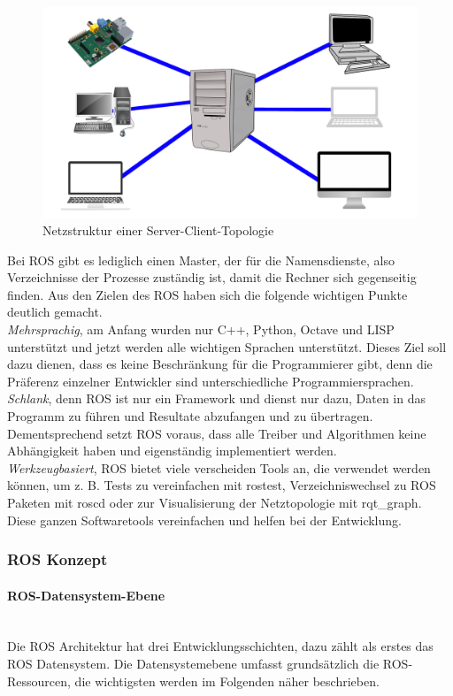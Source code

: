 \begin{figure}[H]
 \centering
 \includegraphics[width=0.7\linewidth]{Bilder/Grundlagen/serverClientTopoliogie.png}
 \caption{Netzstruktur einer Server-Client-Topologie}
 \label{fig:serverClientTopologie}
\end{figure}
Bei ROS gibt es lediglich einen Master, der für die Namensdienste, also Verzeichnisse der Prozesse zuständig ist, damit die Rechner sich gegenseitig finden. \cite{RobotikSichtInformatik.2012}
Aus den Zielen des ROS haben sich die folgende wichtigen Punkte deutlich gemacht.\\ 
\textit{Mehrsprachig}, am Anfang wurden nur C++, Python, Octave und LISP unterstützt und jetzt werden alle wichtigen Sprachen unterstützt. Dieses Ziel soll dazu dienen, dass es keine Beschränkung für die Programmierer gibt, denn die Präferenz einzelner Entwickler sind unterschiedliche Programmiersprachen.\\
\textit{Schlank}, denn ROS ist nur ein Framework und dienst nur dazu, Daten in das Programm zu führen und Resultate abzufangen und zu übertragen. Dementsprechend setzt ROS voraus, dass alle Treiber und Algorithmen keine Abhängigkeit haben und eigenständig implementiert werden.\\
\textit{Werkzeugbasiert}, ROS bietet viele verscheiden Tools an, die verwendet werden können, um z. B. Tests zu vereinfachen mit rostest, Verzeichniswechsel zu ROS Paketen mit roscd oder zur Visualisierung der Netztopologie mit rqt\_graph. Diese ganzen Softwaretools vereinfachen und helfen bei der Entwicklung. \cite[S.326ff]{RobotikSichtInformatik.2012}

\subsubsection{ROS Konzept}

\paragraph{ROS-Datensystem-Ebene}\mbox{}\\
Die ROS Architektur hat drei Entwicklungsschichten, dazu zählt als erstes das ROS Datensystem. Die Datensystemebene umfasst grundsätzlich die ROS-Ressourcen, die wichtigsten werden im Folgenden näher beschrieben. \\

